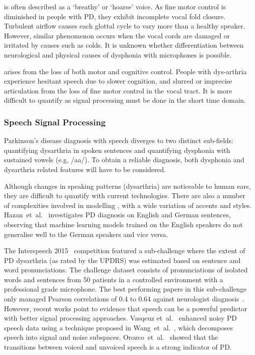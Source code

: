 \documentclass[12pt, twoside]{book}
\renewcommand\emph[1]{\textit{\color{USred}{#1}}}
\begin{document}
\emph{Dysphonia} is often described as a `breathy' or `hoarse' voice. As fine motor control is diminished in people with PD, they exhibit incomplete vocal fold closure. Turbulent airflow causes each glottal cycle to vary more than a healthy speaker. However, similar phenomenon occurs when the vocal cords are damaged or irritated by causes such as colds. It is unknown whether differentiation between neurological and physical causes of dysphonia with microphones is possible.

\emph{Dysarthria} arises from the loss of both motor and cognitive control. People with dys-arthria experience hesitant speech due to slower cognition, and slurred or imprecise articulation from the loss of fine motor control in the vocal tract. It is more difficult to quantify as signal processing must be done in the short time domain. 



\subsubsection{Speech Signal Processing}
Parkinson's disease diagnosis with speech diverges to two distinct sub-fields: quantifying dysarthria in spoken sentences and quantifying dysphonia with sustained vowels (e.g, /aa/). To obtain a reliable diagnosis, both dysphonia and dysarthria related features will have to be considered.

Although changes in speaking patterns (dysarthria) are noticeable to human ears, they are difficult to quantify with current technologies. There are also a number of complexities involved in modelling \emph{spoken language}, with a wide variation of accents and styles. Hazan~et~al.~\cite{hazan2012} investigates PD diagnosis on English and German sentences, observing that machine learning models trained on the English speakers do not generalise well to the German speakers and vice versa. 

The Interspeech 2015~\cite{compareis15pd} competition featured a sub-challenge where the extent of PD dysarthria (as rated by the UPDRS) was estimated based on sentence and word pronunciations. The challenge dataset consists of pronunciations of isolated words and sentences from 50 patients in a controlled environment with a professional grade microphone. The best performing papers in this sub-challenge only managed Pearson correlations of 0.4 to 0.64 against neurologist diagnosis~\cite{hahm2015parkinson,grosz2015assessingis15,williamson2015segment}.
However, recent works point to evidence that speech can be a powerful predictor with better signal processing approaches. Vasqeuz et~al.~\cite{vasquez2015automatic} enhanced noisy PD speech data using a technique proposed in Wang~et~al.~\cite{wang2007speechenhancement}, which decomposes speech into signal and noise subspaces. Orozco~et~al.~\cite{orozco2015voiced} showed that the transitions between voiced and unvoiced speech is a strong indicator of PD.
\end{document}
